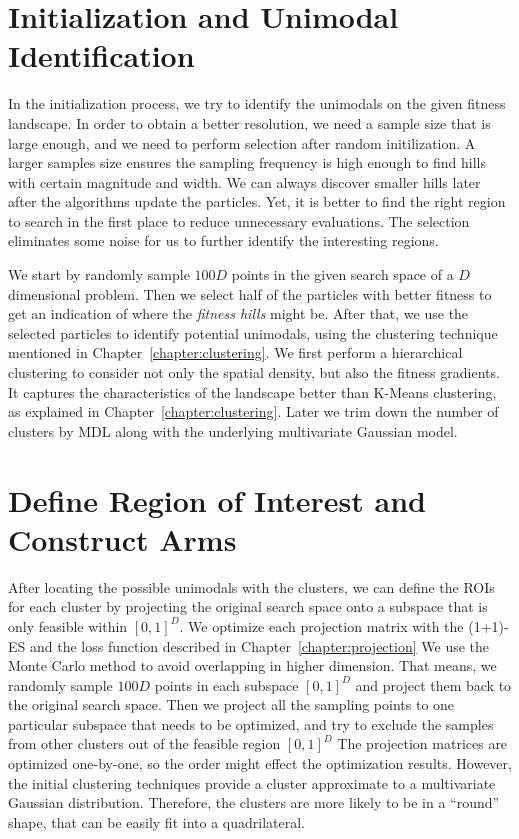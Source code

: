 \section{Initialization and Unimodal Identification}

In the initialization process, we try to identify the unimodals on the given fitness landscape.
In order to obtain a better resolution, we need a sample size that is large enough, and we need to perform selection after random initilization.
A larger samples size ensures the sampling frequency is high enough to find hills with certain magnitude and width.
We can always discover smaller hills later after the algorithms update the particles.
Yet, it is better to find the right region to search in the first place to reduce unnecessary evaluations.
The selection eliminates some noise for us to further identify the interesting regions.

We start by randomly sample $100D$ points in the given search space of a $D$ dimensional problem. 
Then we select half of the particles with better fitness to get an indication of where the \textit{fitness hills} might be.
After that, we use the selected particles to identify potential unimodals,
using the clustering technique mentioned in Chapter~\ref{chapter:clustering}.
We first perform a hierarchical clustering to consider not only the spatial density, but also the fitness gradients.
It captures the characteristics of the landscape better than K-Means clustering, as explained in Chapter~\ref{chapter:clustering}.
Later we trim down the number of clusters by MDL along with the underlying multivariate Gaussian model.



\section{Define Region of Interest and Construct Arms}

After locating the possible unimodals with the clusters, we can define the ROIs for each cluster 
by projecting the original search space onto a subspace that is only feasible within $[0,1]^D$.
We optimize each projection matrix with the (1+1)-ES and the loss function described in Chapter~\ref{chapter:projection} 
We use the Monte Carlo method to avoid overlapping in higher dimension.
That means, we randomly sample $100D$ points in each subspace $[0,1]^D$ and project them back to the original search space.
Then we project all the sampling points to one particular subspace that needs to be optimized, 
and try to exclude the samples from other clusters out of the feasible region $[0,1]^D$
The projection matrices are optimized one-by-one, so the order might effect the optimization results.
However, the initial clustering techniques provide a cluster approximate to a multivariate Gaussian distribution.
Therefore, the clusters are more likely to be in a ``round'' shape, that can be easily fit into a quadrilateral.  


